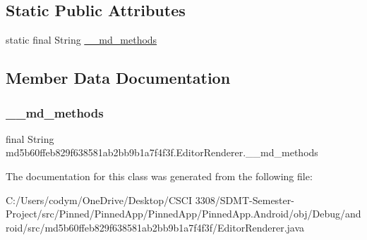 \subsection*{Static Public Attributes}
\begin{DoxyCompactItemize}
\item 
static final String \hyperlink{classmd5b60ffeb829f638581ab2bb9b1a7f4f3f_1_1_editor_renderer_a05a5e2737d5175d2d79f153c42ba484d}{\+\_\+\+\_\+md\+\_\+methods}
\end{DoxyCompactItemize}


\subsection{Member Data Documentation}
\mbox{\label{classmd5b60ffeb829f638581ab2bb9b1a7f4f3f_1_1_editor_renderer_a05a5e2737d5175d2d79f153c42ba484d}} 
\subsubsection{\texorpdfstring{\+\_\+\+\_\+md\+\_\+methods}{\_\_md\_methods}}
{\footnotesize\ttfamily final String md5b60ffeb829f638581ab2bb9b1a7f4f3f.\+Editor\+Renderer.\+\_\+\+\_\+md\+\_\+methods\hspace{0.3cm}{\ttfamily [static]}}



The documentation for this class was generated from the following file\+:\begin{DoxyCompactItemize}
\item 
C\+:/\+Users/codym/\+One\+Drive/\+Desktop/\+C\+S\+C\+I 3308/\+S\+D\+M\+T-\/\+Semester-\/\+Project/src/\+Pinned/\+Pinned\+App/\+Pinned\+App/\+Pinned\+App.\+Android/obj/\+Debug/android/src/md5b60ffeb829f638581ab2bb9b1a7f4f3f/Editor\+Renderer.\+java\end{DoxyCompactItemize}
